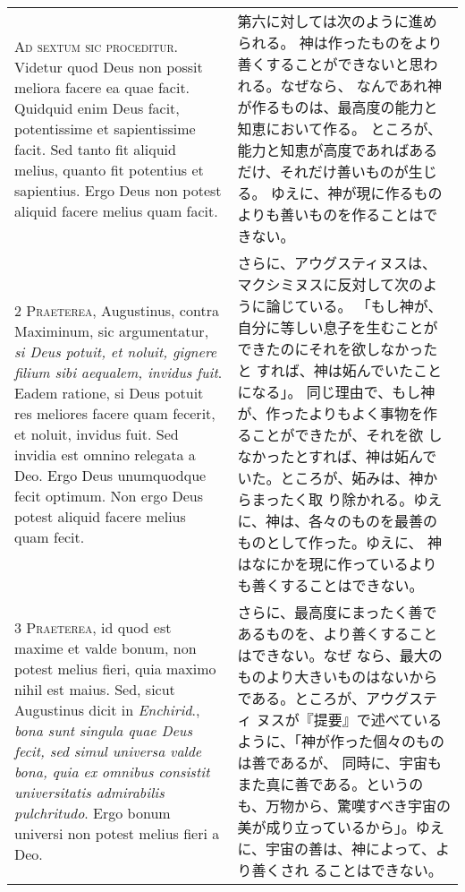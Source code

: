 \documentclass[10pt]{jsarticle} %
\begin{document}
\begin{longtable}{p{21em}p{21em}}


{\huge A}{\scshape d sextum sic proceditur}. Videtur quod Deus
non possit meliora facere ea quae facit. Quidquid enim Deus facit,
potentissime et sapientissime facit. Sed tanto fit aliquid melius,
quanto fit potentius et sapientius. Ergo Deus non potest aliquid facere
melius quam facit.

&

第六に対しては次のように進められる。
神は作ったものをより善くすることができないと思われる。なぜなら、
なんであれ神が作るものは、最高度の能力と知恵において作る。
ところが、能力と知恵が高度であればあるだけ、それだけ善いものが生じる。
ゆえに、神が現に作るものよりも善いものを作ることはできない。


\\


{\scshape 2 Praeterea}, Augustinus, contra Maximinum, sic argumentatur,
{\itshape si Deus potuit, et noluit, gignere filium sibi aequalem,
invidus fuit}. Eadem ratione, si Deus potuit res meliores facere quam
fecerit, et noluit, invidus fuit. Sed invidia est omnino relegata a
Deo. Ergo Deus unumquodque fecit optimum. Non ergo Deus potest aliquid
facere melius quam fecit.


&

さらに、アウグスティヌスは、マクシミヌスに反対して次のように論じている。
 「もし神が、自分に等しい息子を生むことができたのにそれを欲しなかったと
 すれば、神は妬んでいたことになる」。
同じ理由で、もし神が、作ったよりもよく事物を作ることができたが、それを欲
 しなかったとすれば、神は妬んでいた。ところが、妬みは、神からまったく取
 り除かれる。ゆえに、神は、各々のものを最善のものとして作った。ゆえに、
 神はなにかを現に作っているよりも善くすることはできない。

\\

{\scshape 3 Praeterea}, id quod est maxime et valde bonum, non potest
melius fieri, quia maximo nihil est maius. Sed, sicut Augustinus dicit
in {\itshape Enchirid}., {\itshape bona sunt singula quae Deus fecit,
sed simul universa valde bona, quia ex omnibus consistit universitatis
admirabilis pulchritudo}. Ergo bonum universi non potest melius fieri a
Deo.


&

さらに、最高度にまったく善であるものを、より善くすることはできない。なぜ
 なら、最大のものより大きいものはないからである。ところが、アウグスティ
 ヌスが『提要』で述べているように、「神が作った個々のものは善であるが、
 同時に、宇宙もまた真に善である。というのも、万物から、驚嘆すべき宇宙の
 美が成り立っているから」。ゆえに、宇宙の善は、神によって、より善くされ
 ることはできない。


\end{longtable}
\end{document}
